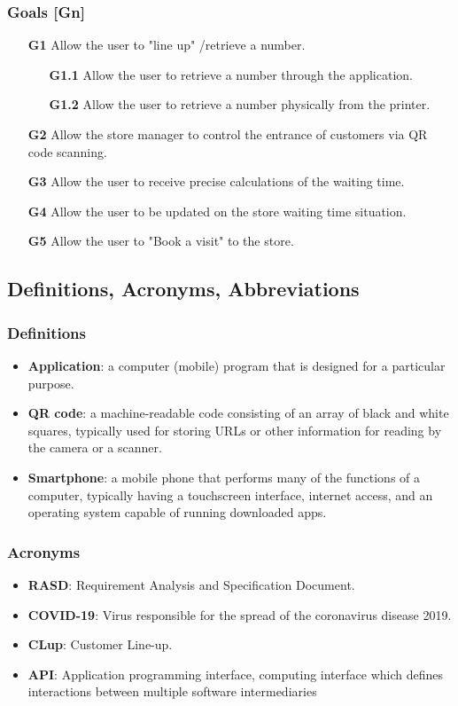 \subsubsection{Goals [Gn]}
\hspace{\parindent}\begin{itemize}
	\item[\textbf{G1}]Allow the user to "line up" /retrieve a number.
	\begin{itemize}
		\item[\textbf{G1.1}]Allow the user to retrieve a number through the application.
		\item[\textbf{G1.2}]Allow the user to retrieve a number physically from the printer. 
	\end{itemize}
	\item[\textbf{G2}]Allow the store manager to control the entrance of customers via QR code scanning. 
	\item[\textbf{G3}]Allow the user to receive precise calculations of the waiting time. 
	\item[\textbf{G4}]Allow the user to be updated on the store waiting time situation.
	\item[\textbf{G5}]Allow the user to "Book a visit" to the store.
\end{itemize}

\newpage
\subsection{Definitions, Acronyms, Abbreviations}
\subsubsection{Definitions}
\begin{itemize}
	\item \textbf{Application}: a computer (mobile) program that is designed for a particular purpose. 
	\item \textbf{QR code}: a machine-readable code consisting of an array of black and white squares, typically used for storing URLs or other information for reading by the camera or a scanner. 
	\item \textbf{Smartphone}: a mobile phone that performs many of the functions of a computer, typically having a touchscreen interface, internet access, and an operating system capable of running downloaded apps. 
\end{itemize}
\subsubsection{Acronyms}
\begin{itemize}
	\item \textbf{RASD}: Requirement Analysis and Specification Document. 
	\item \textbf{COVID-19}: Virus responsible for the spread of the coronavirus disease 2019. 
	\item \textbf{CLup}: Customer Line-up. 
	\item \textbf{API}: Application programming interface, computing interface which defines interactions between multiple software intermediaries 
\end{itemize}
